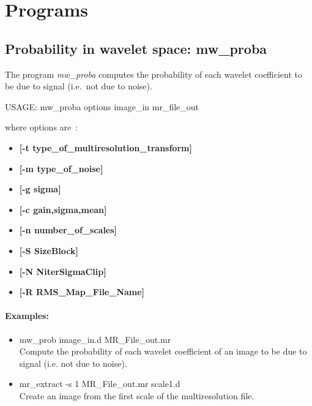 
\chapter{\projmw Programs}
\label{ch_prog_mw}

\section{Probability in wavelet space: mw\_proba}
The program 
{\em mw\_proba} computes the probability of each wavelet coefficient to be
due to signal (i.e.\ not due to noise).
{\bf 
\begin{center}
 USAGE: mw\_proba options image\_in mr\_file\_out
\end{center}}
where options are~:
\begin{itemize}
\baselineskip=0.4truecm
\itemsep=0.1truecm
\item {\bf [-t type\_of\_multiresolution\_transform]} 
\item {\bf [-m type\_of\_noise]}
\item {\bf [-g sigma]}
\item {\bf [-c gain,sigma,mean]}
\item {\bf [-n number\_of\_scales]}
\item {\bf [-S SizeBlock]} \\
\item {\bf [-N NiterSigmaClip]} \\
\item {\bf [-R RMS\_Map\_File\_Name]} \\
\end{itemize}

\subsubsection*{Examples:}
\begin{itemize}
\item mw\_prob image\_in.d MR\_File\_out.mr \\
Compute the probability of each wavelet coefficient of an image
to be due to signal (i.e. not due to noise).
\item mr\_extract -s 1 MR\_File\_out.mr  scale1.d \\
Create an image from the first scale of the multiresolution file.
\end{itemize}

